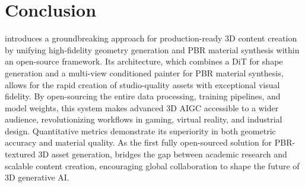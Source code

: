 \section{Conclusion}
\emph{\methodName} introduces a groundbreaking approach for production-ready 3D content creation by unifying high-fidelity geometry generation and PBR material synthesis within an open-source framework. Its architecture, which combines a DiT for shape generation and a multi-view conditioned painter for PBR material synthesis, allows for the rapid creation of studio-quality assets with exceptional visual fidelity. By open-sourcing the entire data processing, training pipelines, and model weights, this system makes advanced 3D AIGC accessible to a wider audience, revolutionizing workflows in gaming, virtual reality, and industrial design. Quantitative metrics demonstrate its superiority in both geometric accuracy and material quality. As the first fully open-sourced solution for PBR-textured 3D asset generation, \emph{\methodName} bridges the gap between academic research and scalable content creation, encouraging global collaboration to shape the future of 3D generative AI.